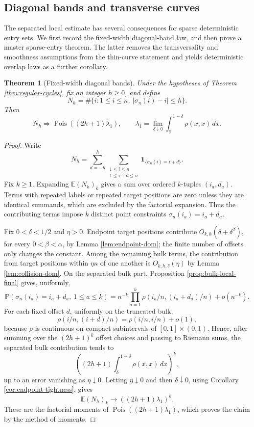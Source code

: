 \documentclass[11pt]{article}
\newtheorem{theorem}{Theorem}[section]
\theoremstyle{remark}
\newcommand{\Pp}{\mathbb P}
\newcommand{\Ee}{\mathbb E}
\newcommand{\one}{\mathbf 1}
\newcommand{\Pois}{\operatorname{Pois}}
\newcommand{\dd}{\,d}
\begin{document}
\subsection{Diagonal bands and transverse curves}\label{subsec:regular-diagonal-consequences}

The separated local estimate has several consequences for sparse deterministic
entry sets.  We first record the fixed-width diagonal-band law, and then prove a
master sparse-entry theorem.  The latter removes the transversality and
smoothness assumptions from the thin-curve statement and yields deterministic
overlap laws as a further corollary.

\begin{theorem}[Fixed-width diagonal bands]\label{thm:diagonal-band}
Under the hypotheses of Theorem \ref{thm:regular-cycles}, fix an integer
\(h\ge0\), and define
\[
        N_h=\#\{i:1\le i\le n,\ |\sigma_n(i)-i|\le h\}.
\]
Then
\[
        N_h\Rightarrow
        \Pois\left((2h+1)\lambda_1\right),
        \qquad
        \lambda_1=\lim_{\delta\downarrow0}
        \int_\delta^{1-\delta}\rho(x,x)\dd x .
\]
\end{theorem}

\begin{proof}
Write
\[
        N_h=\sum_{d=-h}^h\sum_{\substack{1\le i\le n\\1\le i+d\le n}}
        \one_{\{\sigma_n(i)=i+d\}} .
\]
Fix \(k\ge1\).  Expanding \(\Ee(N_h)_k\) gives a sum over ordered \(k\)-tuples
\((i_a,d_a)\).  Terms with repeated labels or repeated target positions are
zero unless they are identical summands, which are excluded by the factorial
expansion.  Thus the contributing terms impose \(k\) distinct point constraints
\(\sigma_n(i_a)=i_a+d_a\).

Fix \(0<\delta<1/2\) and \(\eta>0\).  Endpoint target positions contribute
\(O_{k,h}(\delta+\delta^\beta)\), for every \(0<\beta<\alpha\), by Lemma
\ref{lem:endpoint-dom}; the finite number of offsets only changes the constant.
Among the remaining bulk terms, the contribution from target positions within
\(\eta n\) of one another is \(O_{k,h,\delta}(\eta)\) by Lemma
\ref{lem:collision-dom}.  On the separated bulk part, Proposition
\ref{prop:bulk-local-final} gives, uniformly,
\[
        \Pp(\sigma_n(i_a)=i_a+d_a,\ 1\le a\le k)
        =n^{-k}\prod_{a=1}^k
        \rho(i_a/n,(i_a+d_a)/n)+o(n^{-k}).
\]
For each fixed offset \(d\), uniformly on the truncated bulk,
\[
        \rho(i/n,(i+d)/n)=\rho(i/n,i/n)+o(1),
\]
because \(\rho\) is continuous on compact subintervals of
\([0,1]\times(0,1)\).  Hence, after summing over the \((2h+1)^k\) offset
choices and passing to Riemann sums, the separated bulk contribution tends to
\[
        \left((2h+1)\int_\delta^{1-\delta}\rho(x,x)\dd x\right)^k,
\]
up to an error vanishing as \(\eta\downarrow0\).  Letting
\(\eta\downarrow0\) and then \(\delta\downarrow0\), using Corollary
\ref{cor:endpoint-tightness}, gives
\[
        \Ee(N_h)_k\to ((2h+1)\lambda_1)^k .
\]
These are the factorial moments of \(\Pois((2h+1)\lambda_1)\), which proves the
claim by the method of moments.
\end{proof}
\end{document}
